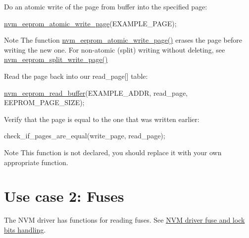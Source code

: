 \begin{DoxyEnumerate}
\begin{DoxyItemize}
\end{DoxyItemize}
\item Do an atomic write of the page from buffer into the specified page\-:
\begin{DoxyItemize}
\item 
\begin{DoxyCode}
        \hyperlink{group__nvm__eeprom__group_ga6f939f98287b320d39418ed72ba8cfe1}{nvm\_eeprom\_atomic\_write\_page}(EXAMPLE\_PAGE);
\end{DoxyCode}

\item \begin{DoxyNote}{Note}
The function \hyperlink{group__nvm__eeprom__group_ga6f939f98287b320d39418ed72ba8cfe1}{nvm\-\_\-eeprom\-\_\-atomic\-\_\-write\-\_\-page()} erases the page before writing the new one. For non-\/atomic (split) writing without deleting, see \hyperlink{group__nvm__eeprom__group_gae8b5ca90e2d370109bed6e6adc8d9307}{nvm\-\_\-eeprom\-\_\-split\-\_\-write\-\_\-page()}
\end{DoxyNote}

\end{DoxyItemize}
\item Read the page back into our read\-\_\-page\mbox{[}\mbox{]} table\-:
\begin{DoxyItemize}
\item 
\begin{DoxyCode}
        \hyperlink{group__nvm__eeprom__group_ga723a1c1ef60ffb4d220f28c99e6c3014}{nvm\_eeprom\_read\_buffer}(EXAMPLE\_ADDR,
                read\_page, EEPROM\_PAGE\_SIZE);
\end{DoxyCode}

\end{DoxyItemize}
\item Verify that the page is equal to the one that was written earlier\-:
\begin{DoxyItemize}
\item 
\begin{DoxyCode}
        check\_if\_pages\_are\_equal(write\_page, read\_page);
\end{DoxyCode}

\item \begin{DoxyNote}{Note}
This function is not declared, you should replace it with your own appropriate function.
\end{DoxyNote}

\end{DoxyItemize}
\end{DoxyEnumerate}\hypertarget{xmega_nvm_quickstart_xmega_nvm_quickstart_fuse_case}{}\section{Use case 2\-: Fuses}\label{xmega_nvm_quickstart_xmega_nvm_quickstart_fuse_case}
The N\-V\-M driver has functions for reading fuses. See \hyperlink{group__nvm__fuse__lock__group}{N\-V\-M driver fuse and lock bits handling}.

